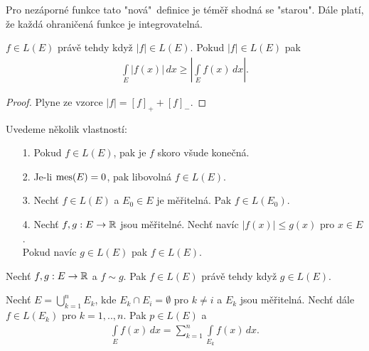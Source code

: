 \begin{poznamka}
Pro nezáporné funkce tato "nová"\, definice je téměř shodná se "starou". Dále platí, že každá ohraničená funkce je integrovatelná.
\end{poznamka}

\begin{theorem}
\label{v_2.16}
$f \in L(E)$ právě tehdy když $|f| \in L(E)$. 
Pokud $|f| \in L(E)$ pak 
\begin{align*}
\int \limits _E |f(x)| \, dx \geq |\int \limits _E f(x) \, dx|.
\end{align*}
\end{theorem}

\begin{proof}
Plyne ze vzorce $|f|=[f]_+ + [f]_-$.
\end{proof}

Uvedeme několik vlastností:
\begin{enumerate}
\item[1.]{Pokud $f \in L(E)$, pak je $f$ skoro všude konečná.}
\item[2.]{Je-li $\operatorname{mes}(E)=0$, pak libovolná $f \in L(E)$.}
\item[3.]{Nechť $f \in L(E)$ a $E_0 \in E$ je měřitelná. Pak $f \in L(E_0)$.}
\item[4.]{Nechť $f,g:E \to \mathbb{R}$ jsou měřitelné. Nechť navíc $|f(x)|\leq g(x)$ pro $x \in E$.\\
Pokud navíc $g \in L(E)$ pak $f \in L(E)$.}
\end{enumerate}

\begin{theorem}
Nechť $f,g:E \to \mathbb{R}$ a $f \sim g$. Pak $f \in L(E)$ právě tehdy když $g \in L(E)$.
\end{theorem}

\begin{theorem}
Nechť $E=\bigcup \limits _{k=1}^n E_k$, kde $E_k \cap E_i = \emptyset$ pro $k \neq i$ a $E_k$ jsou měřitelná. Nechť dále $f \in L(E_k)$ pro $k=1,..,n$. Pak $p \in L(E)$ a 
\begin{align*}
\int \limits _E f(x) \, dx = \sum \limits _{k=1}^n \int \limits _{E_k} f(x) \, dx.
\end{align*}
\label{v_2.18_konecna_aditivita}
\end{theorem}

